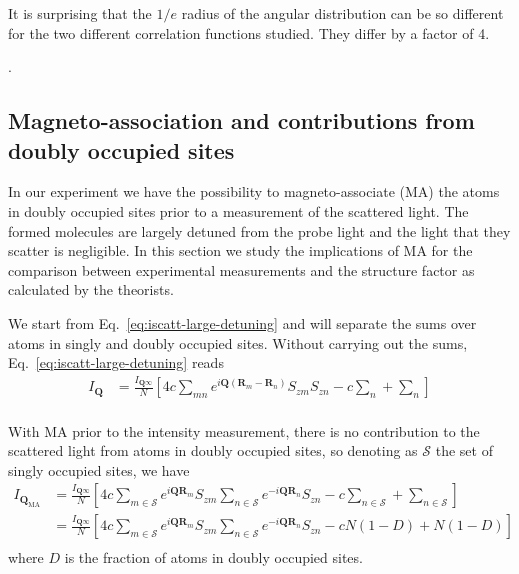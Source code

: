 \documentclass[11pt,letter]{article}
\newcommand{\bv}[1]{\ensuremath{\bm{#1}}}
\newcommand{\Iqtof}{\ensuremath{I_{\bv{Q}\infty} }}
\newcommand{\Iq}{\ensuremath{I_{\bv{Q}} }}
\newcommand{\Iqma}{\ensuremath{I_{\bv{Q}_{\text{MA}}} }}
\begin{document}
It is surprising that the $1/e$ radius of the angular distribution can be so
different for the two different correlation functions studied.  They differ by
a factor of 4. 

\newpage
. 
\newpage

\subsection{Magneto-association and contributions from doubly occupied sites} 

In our experiment we have the possibility to  magneto-associate (MA) the atoms
in doubly occupied sites prior to a measurement of the scattered light.  The
formed molecules  are largely detuned from the probe light and the light that
they scatter is negligible. In this section we study the implications of MA for
the comparison between experimental measurements and the structure factor as
calculated by the theorists. 

We start from Eq.~\ref{eq:iscatt-large-detuning} and will separate the sums
over atoms in singly and doubly occupied sites.  Without carrying out the sums,
Eq.~\ref{eq:iscatt-large-detuning} reads 
\begin{equation}
\begin{split} 
 \Iq 
&  = \frac{ \Iqtof }{N} 
  \left[ 
      4 c \sum_{mn}  
      e^{ i \bv{Q}( \bv{R}_{m} - \bv{R}_{n} ) } 
      S_{zm}S_{zn}
    -  c  \sum_{n} 
  + \sum_{n}  
   \right]  \\ 
\end{split}
\end{equation}

With MA prior to the intensity measurement, there is no contribution to the
scattered light from atoms in doubly occupied sites, so denoting as
$\mathcal{S}$ the set of singly occupied sites, we have 
\begin{equation}
\begin{split} 
 \Iqma  
&  = \frac{ \Iqtof }{N} 
  \left[ 
      4 c \sum_{m\in \mathcal{S}}  
      e^{ i \bv{Q} \bv{R}_{m} } S_{zm} 
      \sum_{n\in \mathcal{S} } 
      e^{ -i \bv{Q} \bv{R}_{n} } S_{zn} 
    -  c  \sum_{n\in \mathcal{S}} 
  + \sum_{n \in \mathcal{S}}  
   \right]  \\ 
&  = \frac{ \Iqtof }{N} 
  \left[ 
      4 c \sum_{m\in \mathcal{S}}  
      e^{ i \bv{Q} \bv{R}_{m} } S_{zm} 
      \sum_{n\in \mathcal{S} } 
      e^{ -i \bv{Q} \bv{R}_{n} } S_{zn} 
    -  c N(1-D)  + N(1-D) 
   \right]  \\ 
\end{split}
\end{equation}
where $D$ is the fraction of atoms in doubly occupied sites.  
\end{document}
